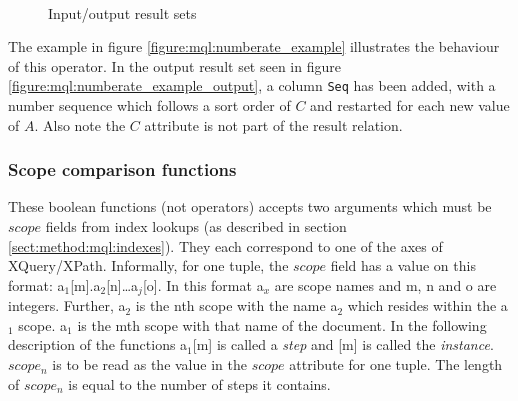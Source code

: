 \begin{figure}[!h]
\centering
\mbox{
\quad
{}
}
\caption{Input/output result sets}
\end{figure}
The example in figure \ref{figure:mql:numberate_example} illustrates the
behaviour of this operator. In the output result set seen in figure
\ref{figure:mql:numberate_example_output}, a column \texttt{Seq} has been
added, with a number sequence which follows a sort order of $C$ and restarted for each new value of $A$.
Also note the $C$ attribute is not part of the result relation.

\subsubsection{Scope comparison functions}

These boolean functions (not operators) accepts two arguments which must be $scope$ fields from index lookups (as
described in section \ref{sect:method:mql:indexes}). They each correspond to one of the axes of XQuery/XPath.
Informally, for one tuple, the $scope$ field has a value on this format:
\textsf{a}$_1$\textsf{[m].}\textsf{a}$_2$\textsf{[n]\ldots}\textsf{a}$_j$\textsf{[o]}. In this format
\textsf{a}$_x$ are scope names and \textsf{m}, \textsf{n} and \textsf{o} are integers. Further, \textsf{a}$_2$ is
the \textsf{n}th scope with the name \textsf{a}$_2$ which resides within the \textsf{a}$_1$ scope. \textsf{a}$_1$
is the \textsf{m}th scope with that name of the document. In the following description of the functions
\textsf{a}$_1$\textsf{[m]} is called a \emph{step} and \textsf{[m]} is called the \emph{instance}. $scope_n$ is to
be read as the value in the $scope$ attribute for one tuple. The length of $scope_n$ is equal to the number of
steps it contains.

